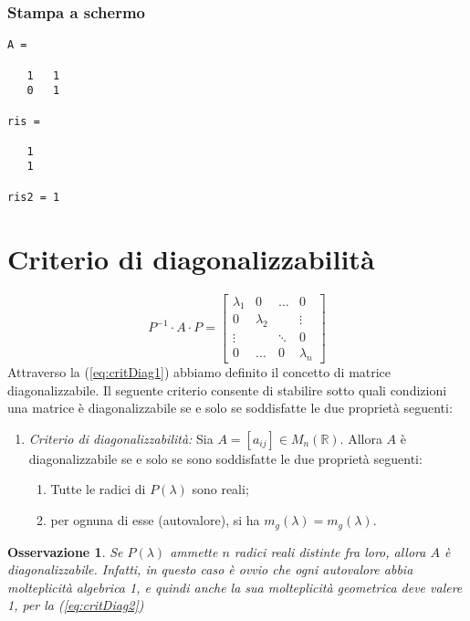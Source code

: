 \documentclass{book}
\newtheorem{oss}{Osservazione}[section]
\begin{document}


\subsubsection{Stampa a schermo}
\label{sec:stauto}

\begin{verbatim}
A =

   1   1
   0   1

ris =

   1
   1

ris2 = 1
\end{verbatim}

\section{Criterio di diagonalizzabilità}
\label{sec:diagonalizzabilità}
\begin{equation}
  \label{eq:critDiag1}
  P^{-1}\cdot A \cdot P=
  \begin{bmatrix}
    \lambda_1 & 0 & \dots & 0\\
    0 & \lambda_2 && \vdots\\
    \vdots && \ddots & 0\\
    0 & \dots & 0 & \lambda_n
  \end{bmatrix}
\end{equation}
Attraverso la (\ref{eq:critDiag1}) abbiamo definito il concetto di matrice diagonalizzabile. Il seguente criterio
consente di stabilire sotto quali condizioni una matrice è diagonalizzabile se e solo se soddisfatte le due
proprietà seguenti:
\begin{enumerate}
\item \textit{Criterio di diagonalizzabilità:} Sia $A=[a_{ij}]\in M_n(\mathds{R})$. Allora $A$ è diagonalizzabile
  se e solo se sono soddisfatte le due proprietà seguenti:
  \begin{enumerate}
  \item Tutte le radici di $P(\lambda)$ sono reali;
  \item per ognuna di esse (autovalore), si ha $m_g(\lambda)=m_g(\lambda)$.
  \end{enumerate}
\end{enumerate}
\begin{oss}
  Se $P(\lambda)$ ammette $n$ radici reali distinte fra loro, allora $A$ è diagonalizzabile. Infatti, in questo
  caso è ovvio che ogni autovalore abbia molteplicità algebrica 1, e quindi anche la sua molteplicità geometrica
  deve valere 1, per la (\ref{eq:critDiag2})
\end{oss}
\end{document}

